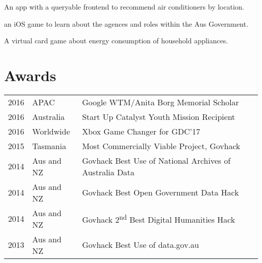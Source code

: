 \documentclass[a4paper]{deedy-resume} %
\begin{document}
\begin{minipage}[t]{0.66\textwidth}


An app with a queryable frontend to recommend air conditioners by location.

\sectionspace %



an iOS game to learn about the agences and roles within the Aus Government.

\sectionspace %



A virtual card game about energy consumption of household appliances.
\sectionspace %


\section{Awards}

\begin{tabular}{rll}
2016	 & APAC & Google WTM/Anita Borg Memorial Scholar\\
2016	 & Australia & Start Up Catalyst Youth Mission Recipient \\
2016	 & Worldwide & Xbox Game Changer for GDC'17\\
2015	 & Tasmania & Most Commercially Viable Project, Govhack\\
2014	 & Aus and NZ & Govhack Best Use of National Archives of Australia Data \\
2014	 & Aus and NZ & Govhack Best Open Government Data Hack \\
2014	 & Aus and NZ & Govhack 2\textsuperscript{nd} Best Digital Humanities Hack \\
2013	 & Aus and NZ & Govhack Best Use of data.gov.au \\
\end{tabular}


\end{minipage}
\end{document}
